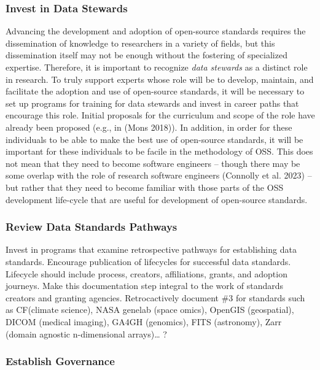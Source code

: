 \documentclass[
  letterpaper,
  DIV=11,
  numbers=noendperiod]{scrartcl}
\begin{document}
\subsubsection{Invest in Data Stewards}\label{invest-in-data-stewards}

Advancing the development and adoption of open-source standards requires
the dissemination of knowledge to researchers in a variety of fields,
but this dissemination itself may not be enough without the fostering of
specialized expertise. Therefore, it is important to recognize
\emph{data stewards} as a distinct role in research. To truly support
experts whose role will be to develop, maintain, and facilitate the
adoption and use of open-source standards, it will be necessary to set
up programs for training for data stewards and invest in career paths
that encourage this role. Initial proposals for the curriculum and scope
of the role have already been proposed (e.g., in (Mons 2018)). In
addition, in order for these individuals to be able to make the best use
of open-source standards, it will be important for these individuals to
be facile in the methodology of OSS. This does not mean that they need
to become software engineers -- though there may be some overlap with
the role of research software engineers (Connolly et al. 2023) -- but
rather that they need to become familiar with those parts of the OSS
development life-cycle that are useful for development of open-source
standards.

\subsubsection{Review Data Standards
Pathways}\label{review-data-standards-pathways}

Invest in programs that examine retrospective pathways for establishing
data standards. Encourage publication of lifecycles for successful data
standards. Lifecycle should include process, creators, affiliations,
grants, and adoption journeys. Make this documentation step integral to
the work of standards creators and granting agencies. Retrocactively
document \#3 for standards such as CF(climate science), NASA genelab
(space omics), OpenGIS (geospatial), DICOM (medical imaging), GA4GH
(genomics), FITS (astronomy), Zarr (domain agnostic n-dimensional
arrays)\ldots{} ?

\subsubsection{Establish Governance}\label{establish-governance}
\end{document}
